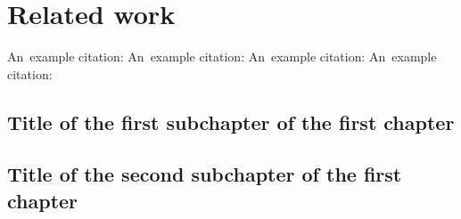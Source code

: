\chapter{Related work}

An~example citation: \cite{Delmonte2014}
An~example citation: \cite{Malmi2016}
An~example citation: \cite{Shi2017}
An~example citation: \cite{Zhang2014}

\section{Title of the first subchapter of the first chapter}

\section{Title of the second subchapter of the first chapter}
